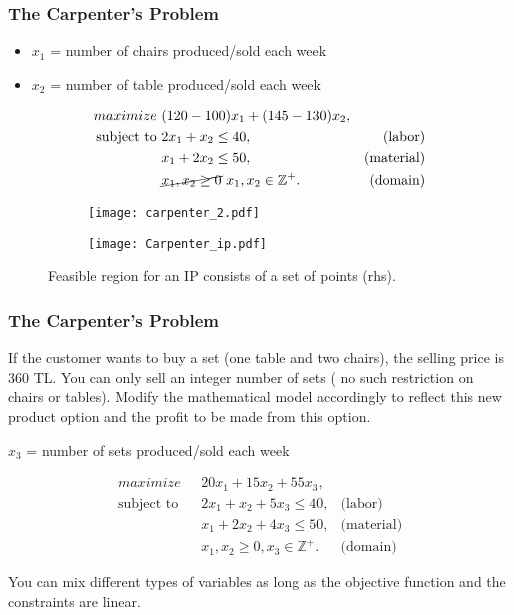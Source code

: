 \documentclass[11pt]{beamer}
\begin{document}
\begin{frame}
\frametitle{The Carpenter’s Problem}
\begin{itemize}
\item $x_1$ = number of chairs produced/sold each week
\item $x_2$ = number of table produced/sold each week
\end{itemize}
\pause  
\begin{align}
\displaystyle maximize \mbox{ } & (120-100)x_1 + (145-130)x_2, \label{carpenter1:objective} \\
% 
\mbox{subject to }&2 x_1 + x_2  \leq 40, & \mbox{(labor)}  \label{carpenter1:labor}\\
&x_1 + 2 x_2  \leq 50, & \mbox{(material)}  \label{carpenter1:material}\\
& \cancel{x_1, x_2 \geq 0 }\mbox{ } x_1, x_2 \in \mathbb{Z^+}. & \mbox{(domain)} \label{carpenter1:domain}
\end{align}

\end{frame}

\begin{frame}
\begin{figure}
\centering
\begin{subfigure}
  \centering
  \texttt{[image: carpenter\_2.pdf]}
\end{subfigure}%
\begin{subfigure}
  \centering
  \texttt{[image: Carpenter\_ip.pdf]}
\end{subfigure}
\caption{Feasible region for an IP consists of a set of points (rhs).}
\end{figure}

\end{frame}


\begin{frame}
\frametitle{The Carpenter's Problem}
If the customer wants to buy a set (one table and two chairs), the selling price is 360 TL. You can only sell an integer number of sets ( no such restriction on chairs or tables). Modify the mathematical model accordingly to reflect this new product option and the profit to be made from this option.

$x_3$ = number of sets produced/sold each week

\pause  
\begin{align}
\displaystyle maximize \mbox{ } & 20 x_1 + 15x_2 + 55x_3, \label{carpenter23:objective} \\
% 
\mbox{subject to }&2 x_1 + x_2  + 5 x_3\leq 40, & \mbox{(labor)}  \label{carpenter23:labor}\\
&x_1 + 2 x_2  + 4x_3\leq 50, & \mbox{(material)}  \label{carpenter23:material}\\
&x_1, x_2 \geq 0, x_3 \in \mathbb{Z^+}. & \mbox{(domain)} \label{carpenter23:domain}
\end{align}

You can mix different types of variables as long as the objective function and the constraints are linear.
\end{frame}
\end{document}
